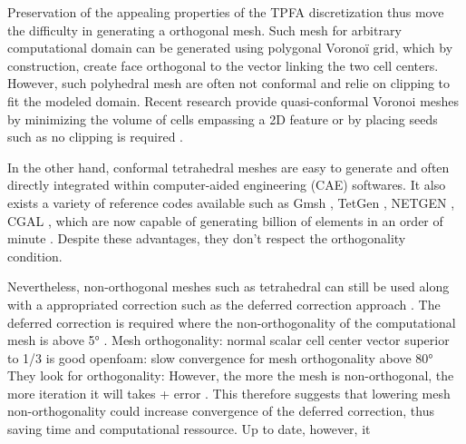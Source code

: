 \documentclass[11pt]{article}
\begin{document}
Preservation of the appealing properties of the TPFA discretization thus move the difficulty in generating a orthogonal mesh.
Such mesh for arbitrary computational domain can be generated using polygonal Voronoï grid, which by construction, create face orthogonal to the vector linking the two cell centers.
However, such polyhedral mesh are often not conformal and relie on clipping to fit the modeled domain.
Recent research provide quasi-conformal Voronoi meshes by minimizing the volume of cells empassing a 2D feature \cite{merland_voronoi_2014} or by placing seeds such as no clipping is required \cite{abdelkader_vorocrust_2020}.

In the other hand, conformal tetrahedral meshes are easy to generate and often directly integrated within computer-aided engineering (CAE) softwares.
It also exists a variety of reference codes available such as Gmsh \cite{geuzaine_gmsh_2007}, TetGen \cite{si_tetgen_2015}, NETGEN \cite{schoberl_netgen_1997}, CGAL \cite{}, which are now capable of generating billion of elements in an order of minute \cite{hextrem}.
Despite these advantages, they don't respect the orthogonality condition.

Nevertheless, non-orthogonal meshes such as tetrahedral can still be used along with a appropriated correction such as the deferred correction approach \cite{jasak_error_1996, moukalled_finite_2016, ferziger_computational_2020}.
The deferred correction is required where the non-orthogonality of the computational mesh is above 5° \cite{}. %
Mesh orthogonality: normal scalar cell center vector superior to 1/3 is good %
openfoam: slow convergence for mesh orthogonality above 80° %
They look for orthogonality: 
However, the more the mesh is non-orthogonal, the more iteration it will takes + error \cite{traore_robust_2009}. %
This therefore suggests that lowering mesh non-orthogonality could increase convergence of the deferred correction, thus saving time and computational ressource.
Up to date, however, it
\end{document}
